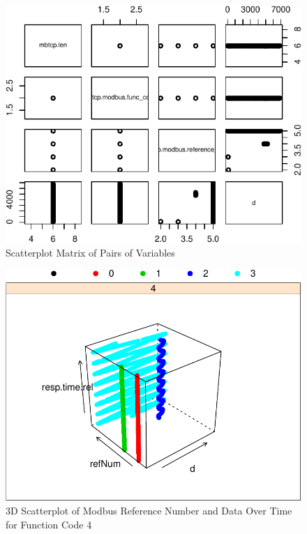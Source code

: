 \documentclass[11pt,]{article}
\begin{document}
\begin{figure}

{\centering \includegraphics{thesis_files/figure-latex/unnamed-chunk-33-1} 

}

\caption{Scatterplot Matrix of Pairs of Variables}\label{fig:unnamed-chunk-33}
\end{figure}

\clearpage

\begin{figure}[middle]

{\centering \includegraphics{thesis_files/figure-latex/unnamed-chunk-34-1} 

}

\caption{3D Scatterplot of Modbus Reference Number
 and Data Over Time for Function Code 4}\label{fig:unnamed-chunk-34}
\end{figure}
\end{document}
